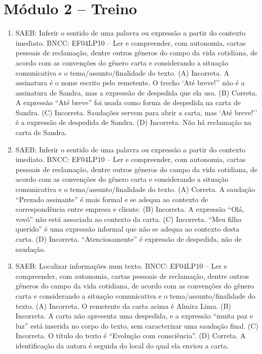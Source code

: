 \section*{Módulo 2 – Treino}

\begin{enumerate}
\item
SAEB: Inferir o sentido de uma palavra ou expressão a partir do
contexto imediato.
BNCC: EF04LP10 -- Ler e compreender, com autonomia, cartas pessoais de
reclamação, dentre outros gêneros do campo da vida cotidiana, de acordo
com as convenções do gênero carta e considerando a situação comunicativa
e o tema/assunto/finalidade do texto.
(A) Incorreta. A assinatura é o nome escrito pelo remetente. O trecho `Até 
breve!'' não é a assinatura de Sandra, mas a expressão de despedida que 
ela usa.
(B) Correta. A expressão ``Até breve'' foi usada como forma de despedida 
na carta de Sandra.
(C) Incorreta. Saudações servem para abrir a carta, mas `Até breve!'' é a 
expressão de despedida de Sandra.   
(D) Incorreta. Não há reclamação na carta de Sandra.

\item
SAEB: Inferir o sentido de uma palavra ou expressão a partir do
contexto imediato.
BNCC: EF04LP10 -- Ler e compreender, com autonomia, cartas pessoais
de reclamação, dentre outros gêneros do campo da vida cotidiana, de
acordo com as convenções do gênero carta e considerando a situação
comunicativa e o tema/assunto/finalidade do texto.
(A) Correta. A saudação ``Prezado assinante'' é mais formal e se adequa ao contexto de correspondência entre empresa e cliente.
(B) Incorreta. A expressão ``Olá, vovó'' não está associada ao contexto da carta. 
(C) Incorreta. ``Meu filho querido'' é uma expressão informal que não se adequa ao contexto desta carta. 
(D) Incorreta. ``Atenciosamente'' é expressão de despedida, não de saudação.

\item
SAEB: Localizar informações num texto.
BNCC: EF04LP10 -- Ler e compreender, com autonomia, cartas pessoais de
reclamação, dentre outros gêneros do campo da vida cotidiana, de acordo
com as convenções do gênero carta e considerando a situação comunicativa
e o tema/assunto/finalidade do texto.
(A) Incorreta. O remetente da carta acima é Almira Lima.
(B)  Incorreta. A carta não apresenta uma despedida, e a expressão ``muita 
paz e luz'' está inserida no corpo do texto, sem caracterizar uma 
saudação final. 
(C) Incorreta. O título do texto é ``Evolução com consciência''.
(D) Correta. A identificação da autora é seguida do local do qual ela
enviou a carta.
\end{enumerate}

